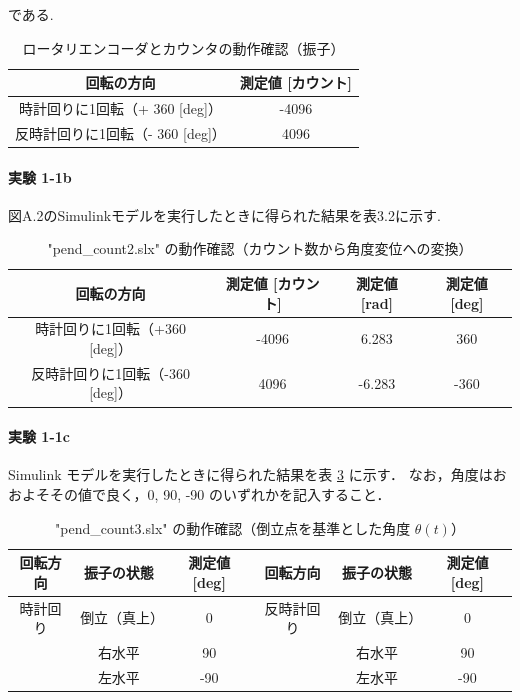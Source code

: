 である.

\begin{table}[h]
  \centering
  \caption{ロータリエンコーダとカウンタの動作確認（振子）}
  \label{tab:rotation}
  \begin{tabular}{|c|c|}
    \hline
    回転の方向                       & 測定値 [カウント] \\
    \hline
    時計回りに1回転（+ 360 [deg]）   & -4096             \\
    反時計回りに1回転（- 360 [deg]） & 4096              \\
    \hline
  \end{tabular}
\end{table}
\paragraph{実験 1-1b}
図A.2のSimulinkモデルを実行したときに得られた結果を表3.2に示す.

\begin{table}[h]
  \centering
  \caption{"pend\_count2.slx" の動作確認（カウント数から角度変位への変換）}
  \label{tab:pend_count2}
  \begin{tabular}{|c|c|c|c|}
    \hline
    回転の方向                      & 測定値 [カウント] & 測定値 [rad] & 測定値 [deg] \\
    \hline
    時計回りに1回転（+360 [deg]）   & -4096             & 6.283        & 360          \\
    反時計回りに1回転（-360 [deg]） & 4096              & -6.283       & -360         \\
    \hline
  \end{tabular}
\end{table}

\paragraph{実験 1-1c}
Simulink モデルを実行したときに得られた結果を表 \ref{tab:pend_count3} に示す．
なお，角度はおおよそその値で良く，0, 90, -90 のいずれかを記入すること．

\begin{table}[h]
  \centering
  \caption{"pend\_count3.slx" の動作確認（倒立点を基準とした角度 $\theta(t)$）}
  \label{tab:pend_count3}
  \begin{tabular}{|c|c|c|c|c|c|}
    \hline
    回転方向 & 振子の状態   & 測定値 [deg] & 回転方向   & 振子の状態   & 測定値 [deg] \\
    \hline
    時計回り & 倒立（真上） & 0            & 反時計回り & 倒立（真上） & 0            \\
             & 右水平       & 90           &            & 右水平       & 90           \\
             & 左水平       & -90          &            & 左水平       & -90          \\
    \hline
  \end{tabular}
\end{table}


